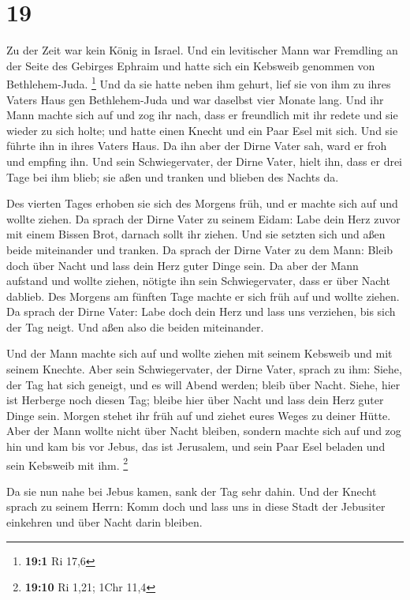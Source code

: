 \hypertarget{section-8}{%
\section{19}\label{section-8}}

 Zu der Zeit war kein König in Israel. Und ein levitischer
Mann war Fremdling an der Seite des Gebirges Ephraim und hatte sich ein
Kebsweib genommen von Bethlehem-Juda. \footnote{\textbf{19:1} Ri 17,6}
 Und da sie hatte neben ihm gehurt, lief sie von ihm zu
ihres Vaters Haus gen Bethlehem-Juda und war daselbst vier Monate lang.
 Und ihr Mann machte sich auf und zog ihr nach, dass er
freundlich mit ihr redete und sie wieder zu sich holte; und hatte einen
Knecht und ein Paar Esel mit sich. Und sie führte ihn in ihres Vaters
Haus. Da ihn aber der Dirne Vater sah, ward er froh und empfing ihn.
 Und sein Schwiegervater, der Dirne Vater, hielt ihn, dass
er drei Tage bei ihm blieb; sie aßen und tranken und blieben des Nachts
da.

 Des vierten Tages erhoben sie sich des Morgens früh, und er
machte sich auf und wollte ziehen. Da sprach der Dirne Vater zu seinem
Eidam: Labe dein Herz zuvor mit einem Bissen Brot, darnach sollt ihr
ziehen.  Und sie setzten sich und aßen beide miteinander und
tranken. Da sprach der Dirne Vater zu dem Mann: Bleib doch über Nacht
und lass dein Herz guter Dinge sein.  Da aber der Mann
aufstand und wollte ziehen, nötigte ihn sein Schwiegervater, dass er
über Nacht dablieb.  Des Morgens am fünften Tage machte er
sich früh auf und wollte ziehen. Da sprach der Dirne Vater: Labe doch
dein Herz und lass uns verziehen, bis sich der Tag neigt. Und aßen also
die beiden miteinander.

 Und der Mann machte sich auf und wollte ziehen mit seinem
Kebsweib und mit seinem Knechte. Aber sein Schwiegervater, der Dirne
Vater, sprach zu ihm: Siehe, der Tag hat sich geneigt, und es will Abend
werden; bleib über Nacht. Siehe, hier ist Herberge noch diesen Tag;
bleibe hier über Nacht und lass dein Herz guter Dinge sein. Morgen
stehet ihr früh auf und ziehet eures Weges zu deiner Hütte.
 Aber der Mann wollte nicht über Nacht bleiben, sondern
machte sich auf und zog hin und kam bis vor Jebus, das ist Jerusalem,
und sein Paar Esel beladen und sein Kebsweib mit ihm. \footnote{\textbf{19:10}
  Ri 1,21; 1Chr 11,4}

 Da sie nun nahe bei Jebus kamen, sank der Tag sehr dahin.
Und der Knecht sprach zu seinem Herrn: Komm doch und lass uns in diese
Stadt der Jebusiter einkehren und über Nacht darin bleiben.

